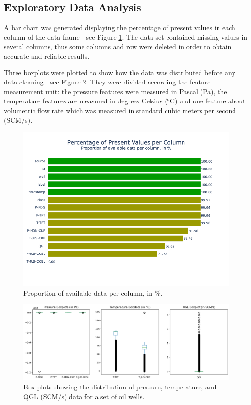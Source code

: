 \documentclass{article}
\begin{document}
\subsection{Exploratory Data Analysis}

A bar chart was generated displaying the percentage of present values in each column of the data frame - see Figure \ref{fig:missingvalues}. The data set contained missing values in several columns, thus some columns and row were deleted in order to obtain accurate and reliable results.

Three boxplots were plotted to show how the data was distributed before any data cleaning - see Figure \ref{fig:distr_boxplots_before_cleaning}. They were divided according the feature measurement unit: the pressure features were measured in Pascal (Pa), the temperature features are measured in degrees Celsius (°C) and one feature about volumetric flow rate which was measured in standard cubic meters per second (SCM/s).

\begin{figure}
\centering
\includegraphics[width=1\textwidth]{missingvalues.png}
\caption{\label{fig:missingvalues}Proportion of available data per column, in \%.}
\end{figure}


\begin{figure}
\centering
\includegraphics[width=1\textwidth]{distr_boxplots_before_cleaning.png}
\caption{\label{fig:distr_boxplots_before_cleaning}Box plots showing the distribution of pressure, temperature, and QGL (SCM/s) data for a set of oil wells.}
\end{figure}
\end{document}
